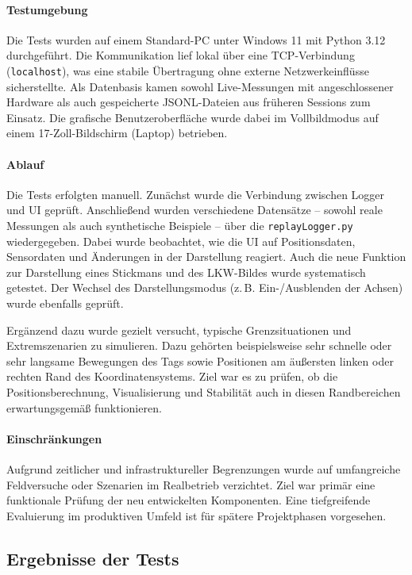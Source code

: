 \documentclass[a4paper, 12pt]{article} %
\begin{document}
\paragraph{Testumgebung}
Die Tests wurden auf einem Standard-PC unter Windows 11 mit Python 3.12 durchgeführt. Die Kommunikation lief lokal über eine \ac{TCP}-Verbindung 
(\texttt{localhost}), was eine stabile Übertragung ohne externe Netzwerkeinflüsse sicherstellte. Als Datenbasis kamen sowohl Live-Messungen mit 
angeschlossener Hardware als auch gespeicherte \ac{JSONL}-Dateien aus früheren Sessions zum Einsatz. Die grafische Benutzeroberfläche wurde dabei im 
Vollbildmodus auf einem 17-Zoll-Bildschirm (Laptop) betrieben.

\paragraph{Ablauf}
Die Tests erfolgten manuell. Zunächst wurde die Verbindung zwischen Logger und UI geprüft. Anschließend wurden verschiedene Datensätze -- sowohl reale
Messungen als auch synthetische Beispiele -- über die \texttt{replayLogger.py \cite{tadic-studienarbeit-ui}} wiedergegeben. Dabei wurde beobachtet, wie die \ac{UI} auf Positionsdaten, 
Sensordaten und Änderungen in der Darstellung reagiert. Auch die neue Funktion zur Darstellung eines Stickmans und des \ac{LKW}-Bildes wurde systematisch 
getestet. Der Wechsel des Darstellungsmodus (z.\,B. Ein-/Ausblenden der Achsen) wurde ebenfalls geprüft.

Ergänzend dazu wurde gezielt versucht, typische Grenzsituationen und Extremszenarien zu simulieren. Dazu gehörten beispielsweise sehr schnelle oder 
sehr langsame Bewegungen des Tags sowie Positionen am äußersten linken oder rechten Rand des Koordinatensystems. Ziel war es zu prüfen, ob die 
Positionsberechnung, Visualisierung und Stabilität auch in diesen Randbereichen erwartungsgemäß funktionieren.

\paragraph{Einschränkungen}
Aufgrund zeitlicher und infrastruktureller Begrenzungen wurde auf umfangreiche Feldversuche oder Szenarien im Realbetrieb verzichtet. Ziel 
war primär eine funktionale Prüfung der neu entwickelten Komponenten. Eine tiefgreifende Evaluierung im produktiven Umfeld ist für spätere 
Projektphasen vorgesehen.

\subsection{Ergebnisse der Tests}
\end{document}
